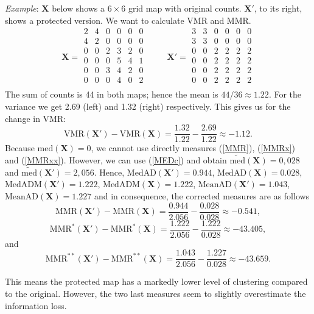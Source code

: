 \begin{tcolorbox}[breakable]
\emph{Example}:
$\mathbf{X}$ below shows a $6 \times 6$ grid map with original counts. $\mathbf{X}'$, to its right, shows a protected version. We want to calculate VMR and MMR.
\[ 
\mathbf{X} = \begin{matrix} 
2 & 4 & 0 & 0 & 0 & 0\\
4 & 2 & 0 & 0 & 0 & 0\\
0 & 0 & 2 & 3 & 2 & 0\\
0 & 0 & 0 & 5 & 4 & 1\\
0 & 0 & 3 & 4 & 2 & 0\\
0 & 0 & 0 & 4 & 0 & 2\\
\end{matrix}
\hspace{1cm}
\mathbf{X}' = \begin{matrix} 
3 & 3 & 0 & 0 & 0 & 0\\
3 & 3 & 0 & 0 & 0 & 0\\
0 & 0 & 2 & 2 & 2 & 2\\
0 & 0 & 2 & 2 & 2 & 2\\
0 & 0 & 2 & 2 & 2 & 2\\
0 & 0 & 2 & 2 & 2 & 2\\
\end{matrix}
\]
The sum of counts is 44 in both maps; hence the mean is $44/36 \approx 1.22$. For the variance we get 2.69 (left) and 1.32 (right) respectively. This gives us for the change in VMR:
\[
\mathrm{VMR}(\mathbf{X}') - \mathrm{VMR}(\mathbf{X})
= \frac{1.32}{1.22} - \frac{2.69}{1.22} \approx - 1.12.
\]
Because $\mathrm{med}(\mathbf{X})=0$, we cannot use directly measures (\ref{MMR}), (\ref{MMRx}) and (\ref{MMRxx}). However, we can use (\ref{MEDc}) and obtain $\mathrm{\widetilde{med}}(\mathbf{X})=0,028$ and $\mathrm{\widetilde{med}}(\mathbf{X}')=2,056$. Hence, $\mathrm{MedAD}(\mathbf{X}')=0.944$, $\mathrm{MedAD}(\mathbf{X})=0.028$, $\mathrm{MedADM}(\mathbf{X}')=1.222$, $\mathrm{MedADM}(\mathbf{X})=1.222$, $\mathrm{MeanAD}(\mathbf{X}')=1.043$, $\mathrm{MeanAD}(\mathbf{X})=1.227$ and in consequence,   the corrected measures are as follows 
\[
\mathrm{MMR}(\mathbf{X}') - \mathrm{MMR}(\mathbf{X})
= \frac{0.944}{2.056} - \frac{0.028}{0.028} \approx -0.541,
\]
\[
\mathrm{MMR^*}(\mathbf{X}') - \mathrm{MMR^*}(\mathbf{X})
= \frac{1.222}{2.056} - \frac{1.222}{0.028}\approx -43.405,
\]
and
\[
\mathrm{MMR^{**}}(\mathbf{X}') - \mathrm{MMR^{**}}(\mathbf{X})
= \frac{1.043}{2.056} - \frac{1.227}{0.028}\approx -43.659.
\]

This means the protected map has a markedly lower level of clustering compared to the original. However, the two last measures seem to slightly overestimate the information loss. 
\end{tcolorbox}


